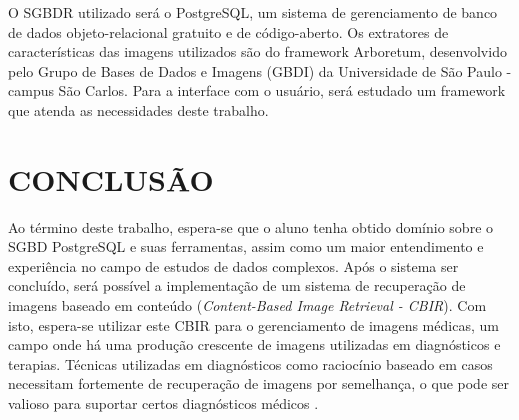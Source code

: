 O SGBDR utilizado será o PostgreSQL, um sistema de gerenciamento de banco de dados objeto-relacional gratuito e de código-aberto. Os extratores de características das imagens utilizados são do framework Arboretum, desenvolvido
pelo Grupo de Bases de Dados e Imagens (GBDI) da Universidade de São Paulo - campus São Carlos. Para a interface com o usuário, será estudado um framework que atenda as necessidades deste trabalho. \\

% 
% 
% 
% 
% 



 
{\let\clearpage\relax \chapter{CONCLUSÃO}} %
\label{chap:conclusao}
Ao término deste trabalho, espera-se que o aluno tenha obtido domínio sobre o SGBD PostgreSQL e suas ferramentas, assim como um maior entendimento e experiência no campo de estudos de dados complexos.
Após o sistema ser concluído, será possível a implementação de um sistema de recuperação de imagens baseado em conteúdo (\textit{Content-Based Image Retrieval - CBIR}). Com isto, espera-se utilizar
este CBIR para o gerenciamento de imagens médicas, um campo onde há uma produção crescente de imagens utilizadas em diagnósticos e terapias. Técnicas utilizadas em diagnósticos como raciocínio baseado
em casos necessitam fortemente de recuperação de imagens por semelhança, o que pode ser valioso para suportar certos diagnósticos médicos \cite{Long2009}. \\



